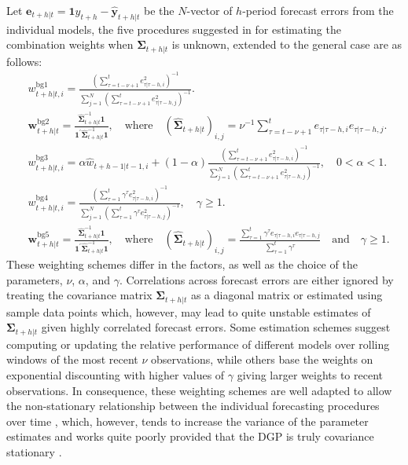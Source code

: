 \documentclass[11pt]{article}
\begin{document}
Let $\mathbf{e}_{t+h|t}=\mathbf{1} y_{t+h}-\hat{\mathbf{y}}_{t+h|t}$ be the $N$-vector of $h$-period forecast errors from the individual models, the five procedures suggested in \cite{Bates1969-yj} for estimating the combination weights when $\boldsymbol{\Sigma}_{t+h|t}$ is unknown, extended to the general case are as follows:
\begin{align}
&w_{t+h|t, i}^{\text{bg1}}=\frac{\left( \sum_{\tau=t-\nu+1}^{t} e_{\tau|\tau-h, i}^{2} \right)^{-1}}{\sum_{j=1}^{N}\left(\sum_{\tau=t-\nu+1}^{t} e_{\tau|\tau-h, j}^{2}\right)^{-1}}. \label{eq:weight_bg1}\\
&\boldsymbol{w}_{t+h|t}^{\text{bg2}}=\frac{\hat{\boldsymbol{\Sigma}}_{t+h|t}^{-1}\mathbf{1}}{\mathbf{1}^{\prime} \hat{\boldsymbol{\Sigma}}_{t+h|t}^{-1} \mathbf{1}}, \quad \text{where} \quad (\hat{\boldsymbol{\Sigma}}_{t+h|t})_{i, j}=\nu^{-1} \sum_{\tau=t-\nu+1}^{t} e_{\tau|\tau-h, i} e_{\tau|\tau-h, j}. \label{eq:weight_bg2}\\
&w_{t+h|t, i}^{\text{bg3}}=\alpha \hat{w}_{t+h-1|t-1, i} + (1-\alpha) \frac{\left( \sum_{\tau=t-\nu+1}^{t} e_{\tau|\tau-h, i}^{2} \right)^{-1}}{\sum_{j=1}^{N}\left(\sum_{\tau=t-\nu+1}^{t} e_{\tau|\tau-h, j}^{2}\right)^{-1}}, \quad 0<\alpha<1. \label{eq:weight_bg3}\\
&w_{t+h|t, i}^{\text{bg4}}=\frac{\left( \sum_{\tau=1}^{t} \gamma^{\tau} e_{\tau|\tau-h, i}^{2} \right)^{-1}}{\sum_{j=1}^{N}\left(\sum_{\tau=1}^{t} \gamma^{\tau} e_{\tau|\tau-h, j}^{2}\right)^{-1}}, \quad \gamma \geq 1. \label{eq:weight_bg4}\\
&\boldsymbol{w}_{t+h|t}^{\text{bg5}}=\frac{\hat{\boldsymbol{\Sigma}}_{t+h|t}^{-1}\mathbf{1}}{\mathbf{1}^{\prime} \hat{\boldsymbol{\Sigma}}_{t+h|t}^{-1} \mathbf{1}}, \quad \text{where} \quad (\hat{\boldsymbol{\Sigma}}_{t+h|t})_{i, j}=\frac{\sum_{\tau=1}^{t} \gamma^{\tau} e_{\tau|\tau-h, i} e_{\tau|\tau-h, j}}{\sum_{\tau=1}^{t} \gamma^{\tau}} \quad \text{and} \quad \gamma \geq 1. \label{eq:weight_bg5}
\end{align}
These weighting schemes differ in the factors, as well as the choice of the parameters, $\nu$, $\alpha$, and $\gamma$. Correlations across forecast errors are either ignored by treating the covariance matrix $\boldsymbol{\Sigma}_{t+h|t}$ as a diagonal matrix or estimated using sample data points which, however, may lead to quite unstable estimates of $\boldsymbol{\Sigma}_{t+h|t}$ given highly correlated forecast errors. Some estimation schemes suggest computing or updating the relative performance of different models over rolling windows of the most recent $\nu$ observations, while others base the weights on exponential discounting with higher values of $\gamma$ giving larger weights to recent observations. In consequence, these weighting schemes are well adapted to allow the non-stationary relationship between the individual forecasting procedures over time \citep{Newbold1974-lp}, which, however, tends to increase the variance of the parameter estimates and works quite poorly provided that the DGP is truly covariance stationary \citep{Timmermann2006-en}.
\end{document}
